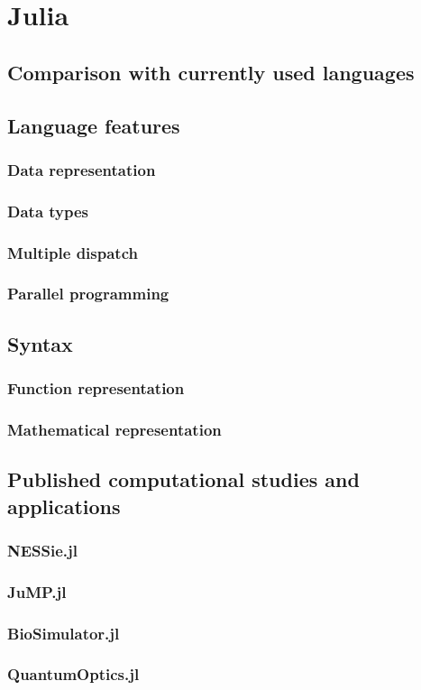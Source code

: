 
\section{Julia}

\subsection{Comparison with currently used languages}
\subsection{Language features}
\subsubsection{Data representation}
\subsubsection{Data types}
\subsubsection{Multiple dispatch}
\subsubsection{Parallel programming}
\subsection{Syntax}
\subsubsection{Function representation}
\subsubsection{Mathematical representation}
\subsection{Published computational studies and applications}
\subsubsection{NESSie.jl}
\subsubsection{JuMP.jl}
\subsubsection{BioSimulator.jl}
\subsubsection{QuantumOptics.jl}
